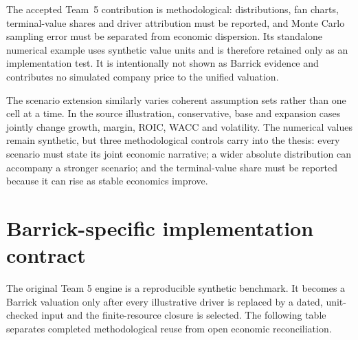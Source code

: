 The accepted Team~5 contribution is methodological: distributions, fan
charts, terminal-value shares and driver attribution must be reported, and
Monte Carlo sampling error must be separated from economic dispersion. Its
standalone numerical example uses synthetic value units and is therefore
retained only as an implementation test. It is intentionally not
shown as Barrick evidence and contributes no simulated company price to the
unified valuation.

The scenario extension similarly varies coherent assumption sets rather than
one cell at a time. In the source illustration, conservative, base and
expansion cases jointly change growth, margin, ROIC, WACC and volatility. The
numerical values remain synthetic, but three methodological controls carry
into the thesis: every scenario must state its joint economic narrative; a
wider absolute distribution can accompany a stronger scenario; and the
terminal-value share must be reported because it can rise as stable economics
improve.

\section{Barrick-specific implementation contract}

The original Team 5 engine is a reproducible synthetic benchmark. It becomes
a Barrick valuation only after every illustrative driver is replaced by a
dated, unit-checked input and the finite-resource closure is selected. The
following table separates completed methodological reuse from open economic
reconciliation.

